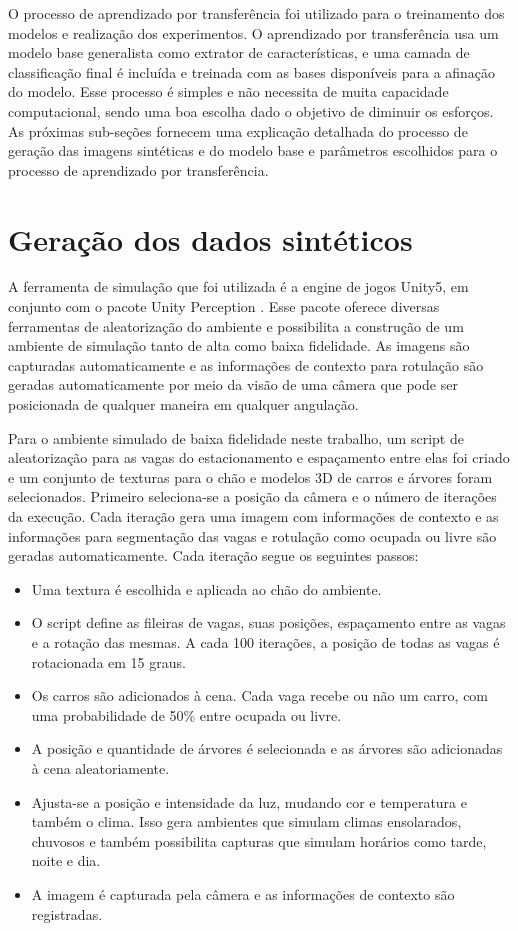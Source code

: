O processo de aprendizado por transferência foi utilizado para o treinamento dos modelos e realização dos experimentos. O aprendizado por transferência usa um modelo base generalista como extrator de características, e uma camada de classificação final é incluída e treinada com as bases disponíveis para a afinação do modelo. Esse processo é simples e não necessita de muita capacidade computacional, sendo uma boa escolha dado o objetivo de diminuir os esforços. As próximas sub-seções fornecem uma explicação detalhada do processo de geração das imagens sintéticas e do modelo base e parâmetros escolhidos para o processo de aprendizado por transferência.

\section{Geração dos dados sintéticos}

A ferramenta de simulação que foi utilizada é a engine de jogos Unity5, em conjunto com o pacote Unity Perception \citep{unity-perception}. Esse pacote oferece diversas ferramentas de aleatorização do ambiente e possibilita a construção de um ambiente de simulação tanto de alta como baixa fidelidade. As imagens são capturadas automaticamente e as informações de contexto para rotulação são geradas automaticamente por meio da visão de uma câmera que pode ser posicionada de qualquer maneira em qualquer angulação. 

Para o ambiente simulado de baixa fidelidade neste trabalho, um script de aleatorização para as vagas do estacionamento e espaçamento entre elas foi criado e um conjunto de texturas para o chão e modelos 3D de carros e árvores foram selecionados. Primeiro seleciona-se a posição da câmera e o número de iterações da execução. Cada iteração gera uma imagem com informações de contexto e as informações para segmentação das vagas e rotulação como ocupada ou livre são geradas automaticamente. Cada iteração segue os seguintes passos:
\begin{itemize}
    \item Uma textura é escolhida e aplicada ao chão do ambiente.
    \item O script define as fileiras de vagas, suas posições, espaçamento entre as vagas e a rotação das mesmas. A cada 100 iterações, a posição de todas as vagas é rotacionada em 15 graus.
    \item Os carros são adicionados à cena. Cada vaga recebe ou não um carro, com uma probabilidade de 50\% entre ocupada ou livre.
    \item A posição e quantidade de árvores é selecionada e as árvores são adicionadas à cena aleatoriamente.
    \item Ajusta-se a posição e intensidade da luz, mudando cor e temperatura e também o clima. Isso gera ambientes que simulam climas ensolarados, chuvosos e também possibilita capturas que simulam horários como tarde, noite e dia.
    \item A imagem é capturada pela câmera e as informações de contexto são registradas.
\end{itemize}

